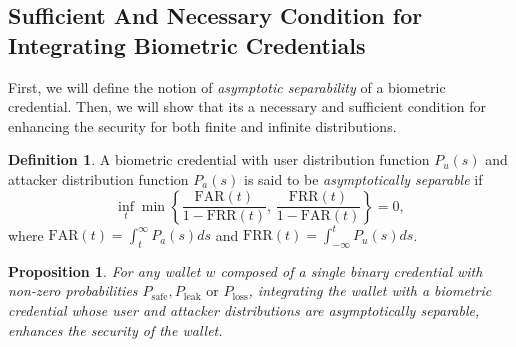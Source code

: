 \documentclass[sigconf]{acmart}
\newtheorem{proposition}{Proposition}
\theoremstyle{definition}
\newtheorem{definition}{Definition}
\begin{document}
\subsection{Sufficient And Necessary Condition for Integrating Biometric Credentials}\label{sec:6.2}
First, we will define the notion of \emph{asymptotic separability} of a biometric credential. Then, we will show that its a necessary and sufficient condition for enhancing the security for both finite and infinite distributions.
\begin{definition}
A biometric credential with user distribution function $P_u(s)$
and attacker distribution function $P_a(s)$ is said to be \emph{asymptotically separable} if
\[
\inf_{t}
\min\!\left\{
\frac{\mathrm{FAR}(t)}{1-\mathrm{FRR}(t)},\,
\frac{\mathrm{FRR}(t)}{1-\mathrm{FAR}(t)}
\right\}
= 0,
\]
where $\mathrm{FAR}(t) = \int_{t}^{\infty} P_a(s) ds$ and $\mathrm{FRR}(t) = \int_{-\infty}^{t} P_u(s) ds$.
\end{definition}

\begin{proposition}
    For any wallet $w$ composed of a single binary credential with non-zero probabilities $P_\text{safe}, P_\text{leak} \text{ or } P_\text{loss}$, integrating the wallet with a biometric credential whose user and attacker distributions are asymptotically separable, enhances the security of the wallet.
\end{proposition}
\end{document}

